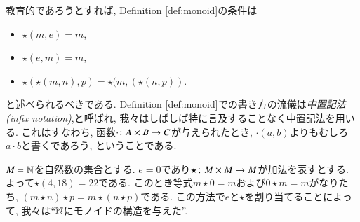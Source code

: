 \begin{remark}


教育的であろうとすれば, Definition \ref{def:monoid}の条件は
\begin{itemize}
\item $\star(m,e)=m$,
\item $\star(e,m)=m$,
\item $\star(\star(m,n),p)=\star(m,(\star(n,p))$.
\end{itemize}
と述べられるべきである. Definition \ref{def:monoid}での書き方の流儀は\emph{中置記法(infix notation)},と呼ばれ, 我々はしばしば特に言及することなく中置記法を用いる. これはすなわち, 函数$\cdot\colon A\times B\rightarrow C$が与えられたとき, $\cdot(a,b)$よりもむしろ$a\cdot b$と書くであろう, ということである.

\end{remark}

\begin{example}[自然数の加法モノイド]\label{ex:monoid 0}


$M={\mathbb N}$を自然数の集合とする. $e=0$であり$\star\colon M\times M\rightarrow M$が加法を表すとする. よって$\star(4,18)=22$である. このとき等式$m\star 0=m$および$0\star m=m$がなりたち, $(m\star n)\star p=m\star (n\star p)$である. この方法で$e$と$\star$を割り当てることによって, 我々は``${\mathbb N}$にモノイドの構造を与えた''.

\end{example}

